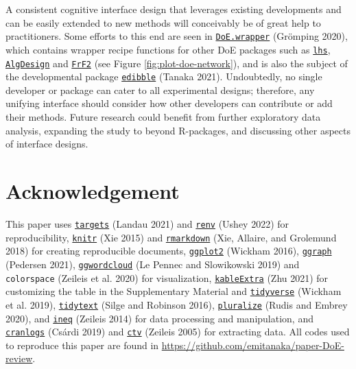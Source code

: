 \documentclass{article}
\begin{document}
A consistent cognitive interface design that leverages existing
developments and can be easily extended to new methods will conceivably
be of great help to practitioners. Some efforts to this end are seen in
\href{https://cran.r-project.org/web/packages/DoE.wrapper/index.html}{\texttt{DoE.wrapper}}
(Grömping 2020), which contains wrapper recipe functions for other DoE
packages such as
\href{https://cran.r-project.org/web/packages/lhs/index.html}{\texttt{lhs}},
\href{https://cran.r-project.org/web/packages/AlgDesign/index.html}{\texttt{AlgDesign}}
and
\href{https://cran.r-project.org/web/packages/FrF2/index.html}{\texttt{FrF2}}
(see Figure \ref{fig:plot-doe-network}), and is also the subject of the
developmental package
\href{https://cran.r-project.org/web/packages/edibble/index.html}{\texttt{edibble}}
(Tanaka 2021). Undoubtedly, no single developer or package can cater to
all experimental designs; therefore, any unifying interface should
consider how other developers can contribute or add their methods.
Future research could benefit from further exploratory data analysis,
expanding the study to beyond R-packages, and discussing other aspects
of interface designs.

\hypertarget{pkgs}{%
\section{Acknowledgement}\label{pkgs}}

This paper uses
\href{https://cran.r-project.org/web/packages/targets/index.html}{\texttt{targets}}
(Landau 2021) and
\href{https://cran.r-project.org/web/packages/renv/index.html}{\texttt{renv}}
(Ushey 2022) for reproducibility,
\href{https://cran.r-project.org/web/packages/knitr/index.html}{\texttt{knitr}}
(Xie 2015) and
\href{https://cran.r-project.org/web/packages/rmarkdown/index.html}{\texttt{rmarkdown}}
(Xie, Allaire, and Grolemund 2018) for creating reproducible documents,
\href{https://cran.r-project.org/web/packages/ggplot2/index.html}{\texttt{ggplot2}}
(Wickham 2016),
\href{https://cran.r-project.org/web/packages/ggraph/index.html}{\texttt{ggraph}}
(Pedersen 2021),
\href{https://cran.r-project.org/web/packages/ggwordcloud/index.html}{\texttt{ggwordcloud}}
(Le Pennec and Slowikowski 2019) and \texttt{colorspace} (Zeileis et al.
2020) for visualization,
\href{https://cran.r-project.org/web/packages/kableExtra/index.html}{\texttt{kableExtra}}
(Zhu 2021) for customizing the table in the Supplementary Material and
\href{https://cran.r-project.org/web/packages/tidyverse/index.html}{\texttt{tidyverse}}
(Wickham et al. 2019),
\href{https://cran.r-project.org/web/packages/tidytext/index.html}{\texttt{tidytext}}
(Silge and Robinson 2016),
\href{https://cran.r-project.org/web/packages/pluralize/index.html}{\texttt{pluralize}}
(Rudis and Embrey 2020), and
\href{https://cran.r-project.org/web/packages/ineq/index.html}{\texttt{ineq}}
(Zeileis 2014) for data processing and manipulation, and
\href{https://cran.r-project.org/web/packages/cranlogs/index.html}{\texttt{cranlogs}}
(Csárdi 2019) and
\href{https://cran.r-project.org/web/packages/ctv/index.html}{\texttt{ctv}}
(Zeileis 2005) for extracting data. All codes used to reproduce this
paper are found in \url{https://github.com/emitanaka/paper-DoE-review}.
\end{document}
